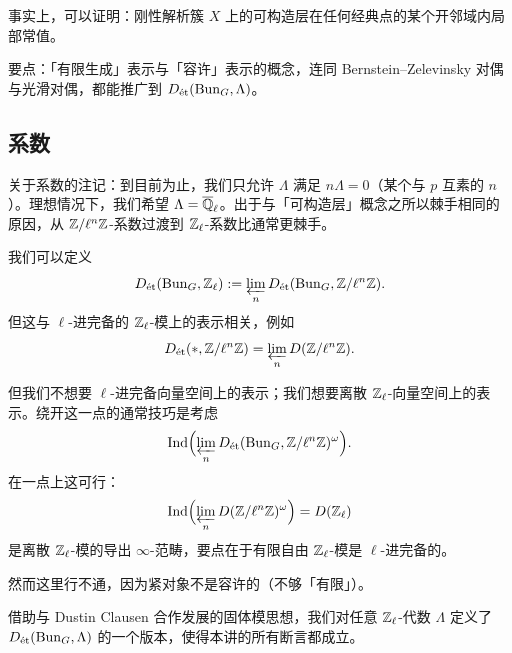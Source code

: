 事实上，可以证明：刚性解析簇 $X$ 上的可构造层在任何经典点的某个开邻域内局部常值。

要点：「有限生成」表示与「容许」表示的概念，连同 Bernstein--Zelevinsky 对偶与光滑对偶，都能推广到 $D_{\et}(\Bun_G,\Lambda)$。

\subsection{系数}

关于系数的注记：到目前为止，我们只允许 $\Lambda$ 满足 $n\Lambda=0$（某个与 $p$ 互素的 $n$）。理想情况下，我们希望 $\Lambda=\Ql$。出于与「可构造层」概念之所以棘手相同的原因，从 $\ZZ/\ell^n\ZZ$-系数过渡到 $\ZZ_\ell$-系数比通常更棘手。

我们可以定义
\[
D_{\et}(\Bun_G,\ZZ_\ell):=\varprojlim_n D_{\et}(\Bun_G,\ZZ/\ell^n\ZZ).
\]
但这与 $\ell$-进完备的 $\ZZ_\ell$-模上的表示相关，例如
\[
D_{\et}(*,\ZZ/\ell^n\ZZ)=\varprojlim_n D(\ZZ/\ell^n\ZZ).
\]

但我们不想要 $\ell$-进完备向量空间上的表示；我们想要离散 $\ZZ_\ell$-向量空间上的表示。绕开这一点的通常技巧是考虑
\[
\Ind\Bigl(\varprojlim_n D_{\et}(\Bun_G,\ZZ/\ell^n\ZZ)^\omega\Bigr).
\]
在一点上这可行：
\[
\Ind\Bigl(\varprojlim_n D(\ZZ/\ell^n\ZZ)^\omega\Bigr)=D(\ZZ_\ell)
\]
是离散 $\ZZ_\ell$-模的导出 $\infty$-范畴，要点在于有限自由 $\ZZ_\ell$-模是 $\ell$-进完备的。


然而这里行不通，因为紧对象不是容许的（不够「有限」）。

借助与 Dustin Clausen 合作发展的固体模思想，我们对任意 $\ZZ_\ell$-代数 $\Lambda$ 定义了 $D_{\et}(\Bun_G,\Lambda)$ 的一个版本，使得本讲的所有断言都成立。

